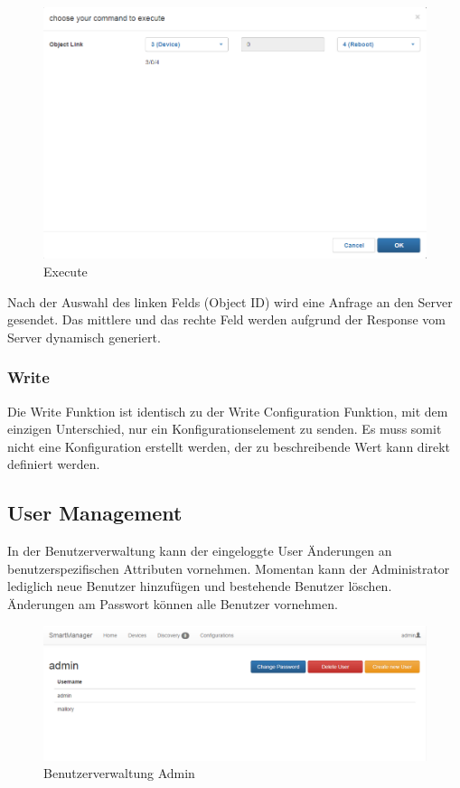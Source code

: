 \begin{figure}[H]
\centering
\includegraphics[scale=0.6]{../04_Realisierung/images/userinterface/execute.png}
\caption{Execute}
\end{figure}

Nach der Auswahl des linken Felds (Object ID) wird eine Anfrage an den Server gesendet. Das mittlere und das rechte Feld werden aufgrund der Response vom Server dynamisch generiert.

\subsubsection{Write}
Die Write Funktion ist identisch zu der Write Configuration Funktion, mit dem einzigen Unterschied, nur ein Konfigurationselement zu senden. Es muss somit nicht eine Konfiguration erstellt werden, der zu beschreibende Wert kann direkt definiert werden.

\subsection{User Management}
In der Benutzerverwaltung kann der eingeloggte User Änderungen an benutzerspezifischen Attributen vornehmen. Momentan kann der Administrator lediglich neue Benutzer hinzufügen und bestehende Benutzer löschen. Änderungen am Passwort können alle Benutzer vornehmen. 

\begin{figure}[H]
\centering
\includegraphics[scale=0.6]{../04_Realisierung/images/userinterface/usermanagement.png}
\caption{Benutzerverwaltung Admin}
\end{figure}

